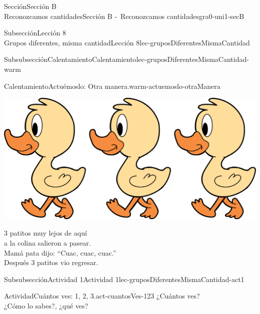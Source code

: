 \begin{sectionptx}{Sección}{{\Large Sección B\\}Reconozcamos cantidades}{}{Sección B -~Reconozcamos cantidades}{}{}{gra0-uni1-secB}
\begin{subsectionptx}{Subsección}{{\normalsize Lección 8\\[-0.05cm]}Grupos diferentes, misma cantidad}{}{Lección 8}{}{}{lec-gruposDiferentesMismaCantidad}
%
%
\typeout{************************************************}
\typeout{************************************************}
%
\begin{subsubsectionptx}{Subsubsección}{Calentamiento}{}{Calentamiento}{}{}{lec-gruposDiferentesMismaCantidad-warm}
\begin{exploration}{Calentamiento}{Actuémoslo: Otra manera.}{warm-actuemoslo-otraManera}%
\begin{image}{0.0}{1}{0.0}{}%
\includegraphics[max width=\linewidth, center]{external/png-source/3 ducks.png}
\end{image}%
%
\par
\vspace*{2ex}
3 patitos muy lejos de aquí\\
 a la colina salieron a pasear.\\
 Mamá pata dijo: “Cuac, cuac, cuac.”\\
 Después 3 patitos vio regresar.%
\end{exploration}%
\end{subsubsectionptx}
%
%
\typeout{************************************************}
\typeout{************************************************}
%
\clearpage
\begin{subsubsectionptx}{Subsubsección}{Actividad 1}{}{Actividad 1}{}{}{lec-gruposDiferentesMismaCantidad-act1}
\begin{activity}{Actividad}{Cuántos ves: 1, 2, 3.}{act-cuantosVes-123}%
¿Cuántos ves?\\
 ¿Cómo lo sabes?, ¿qué ves?%
\begin{sidebyside}{3}{0.0416666666666667}{0.0416666666666667}{0.0833333333333333}%
\begin{sbspanel}{0.25}%

\end{sbspanel}
\end{sidebyside}
\end{activity}
\end{subsubsectionptx}
\end{subsectionptx}
\end{sectionptx}
